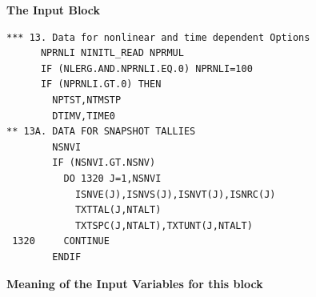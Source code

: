 \medskip

\textbf{The Input Block}

\begin{lstlisting}
*** 13. Data for nonlinear and time dependent Options
      NPRNLI NINITL_READ NPRMUL
      IF (NLERG.AND.NPRNLI.EQ.0) NPRNLI=100
      IF (NPRNLI.GT.0) THEN
        NPTST,NTMSTP
        DTIMV,TIME0
** 13A. DATA FOR SNAPSHOT TALLIES
        NSNVI
        IF (NSNVI.GT.NSNV)
          DO 1320 J=1,NSNVI
            ISNVE(J),ISNVS(J),ISNVT(J),ISNRC(J)
            TXTTAL(J,NTALT)
            TXTSPC(J,NTALT),TXTUNT(J,NTALT)
 1320     CONTINUE
        ENDIF
\end{lstlisting}

\medskip

\textbf{Meaning of the Input Variables for this block}

\medskip

